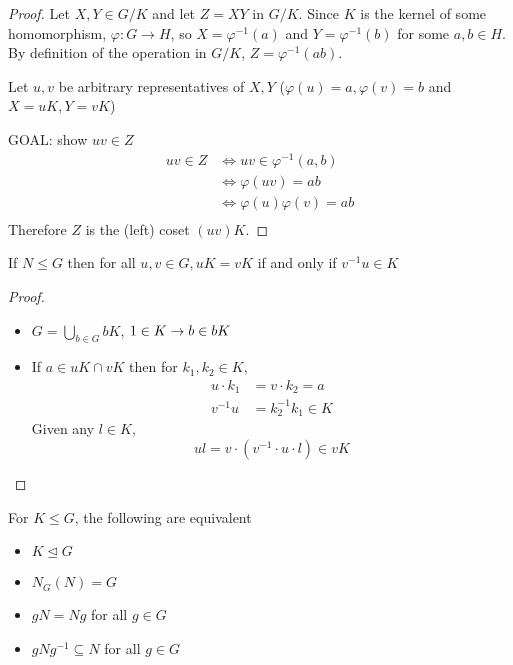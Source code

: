 \begin{proof}
  Let $X, Y \in G/K$ and let $Z = XY$ in $G/K$. Since $K$ is the kernel of some homomorphism,
  $\varphi: G \to H$, so $X = \varphi^{-1}(a)$ and $Y = \varphi^{-1}(b)$ for some $a, b \in H$.
  By definition of the operation in $G/K$, $Z = \varphi^{-1}(ab)$. 

  Let $u, v$ be arbitrary representatives of $X, Y$ ($\varphi(u) = a, \varphi(v)=b$ and $X = uK, Y = vK$)

  GOAL: show $uv \in Z$
  \begin{align*}
    uv \in Z &\iff uv \in \varphi^{-1}(a, b) \\
    &\iff \varphi(uv) = ab \\
    &\iff \varphi(u)\varphi(v) = ab \\ 
  \end{align*}
  Therefore $Z$ is the (left) coset $(uv)K$.
\end{proof}

\begin{proposition}
  If $N \le G$ then for all $u, v \in G, uK = vK$ if and only if $v^{-1}u\in K$
\end{proposition}

\begin{proof}
  \text{ }
  \begin{itemize}
    \item $\displaystyle G = \bigcup_{b \in G} bK$, $1 \in K \rightarrow b \in bK$ 
    \item If $a \in uK \cap vK$ then for $k_1, k_2 \in K$,
    \begin{align*}
      u\cdot k_1 &= v \cdot k_2 = a \\
      v^{-1}u &= k_2^{-1}k_1 \in K
    \end{align*}
    Given any $l \in K$, 
    \[ul = v \cdot (v^{-1} \cdot u \cdot l) \in vK\]
  \end{itemize}

\end{proof}

\begin{theorem}
  For $K \le G$, the following are equivalent
  \begin{itemize}
    \item $K \trianglelefteq G$
    \item $N_G(N) = G$
    \item $gN = Ng$ for all $g \in G$

    \item $gNg^{-1} \subseteq N$ for all $g \in G$
  \end{itemize}
\end{theorem}